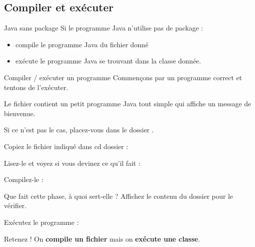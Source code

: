 \documentclass[a4paper,11pt]{style-esi/td}
\begin{document}
	\subsection{Compiler et exécuter}

		\begin{theorie}{Java sans package}
			Si le programme Java n'utilise pas de package :
			\begin{itemize}
				\item {} compile le programme Java du fichier donné
				\item {} exécute le programme Java se trouvant dans la classe donnée.
			\end{itemize}
		\end{theorie}

		\begin{Tutoriel}{Compiler / exécuter un programme} 
			Commençons par un programme correct et tentons de l'exécuter.  
		
			Le fichier  
			contient un petit programme Java tout simple qui affiche un message de bienvenue. 
			
			\begin{steps}	
			\item 
				Si ce n'est pas le cas, placez-vous dans le dossier .
			\item 
				Copiez le fichier indiqué dans cd dossier :
			\item 
				Lisez-le et voyez si vous devinez ce qu'il fait : 
			\item 
				Compilez-le : 
			\item 
				Que fait cette phase, à quoi sert-elle ?
				Affichez le contenu du dossier pour le vérifier.
			\item Exécutez le programme : 
			\end{steps}			
		\end{Tutoriel}


		\begin{alerttbox}{Retenez !} 
			On \textbf{compile un fichier} mais on \textbf{exécute une classe}.
		\end{alerttbox}
\end{document}
